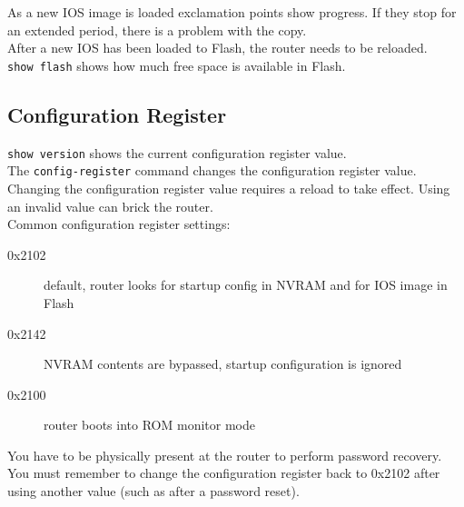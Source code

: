 As a new IOS image is loaded exclamation points show progress. If they stop
for an extended period, there is a problem with the copy.\\

After a new IOS has been loaded to Flash, the router needs to be reloaded.\\

\texttt{show flash} shows how much free space is available in Flash.

\subsection{Configuration Register}

\texttt{show version} shows the current configuration register value.\\

The \texttt{config-register} command changes the configuration register value.
Changing the configuration register value requires a reload to take effect.
Using an invalid value can brick the router.\\

Common configuration register settings:

\begin{description}

\item[0x2102]
default, router looks for startup config in NVRAM and for IOS image in Flash

\item[0x2142]
NVRAM contents are bypassed, startup configuration is ignored

\item[0x2100]
router boots into ROM monitor mode

\end{description}

You have to be physically present at the router to perform password recovery.\\

You must remember to change the configuration register back to 0x2102 after
using another value (such as after a password reset).

